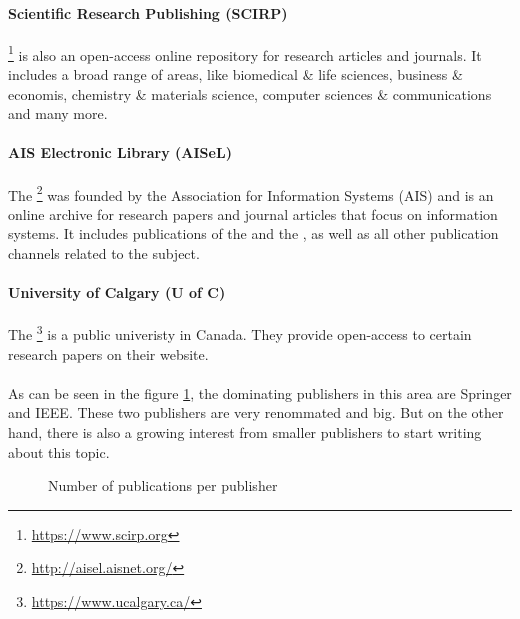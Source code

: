 \paragraph{Scientific Research Publishing (SCIRP)} \footnote{\url{https://www.scirp.org}} is also an open-access online repository for research articles and journals. It includes a broad range of areas, like biomedical \& life sciences, business \& economis, chemistry \& materials science, computer sciences \& communications and many more.
\paragraph{AIS Electronic Library (AISeL)} The \footnote{\url{http://aisel.aisnet.org/}} was founded by the Association for Information Systems (AIS) and is an online archive for research papers and journal articles that focus on information systems. It includes publications of the  and the , as well as all other publication channels related to the subject.
\paragraph{University of Calgary (U of C)} The \footnote{\url{https://www.ucalgary.ca/}} is a public univeristy in Canada. They provide open-access to certain research papers on their website.
\clearpage
\paragraph{} As can be seen in the figure \ref{fig:rq1_publishers}, the dominating publishers in this area are Springer and IEEE. These two publishers are very renommated and big. But on the other hand, there is also a growing interest from smaller publishers to start writing about this topic.
\begin{figure}[!ht]
	\centering
	\caption{Number of publications per publisher} 	
	\label{fig:rq1_publishers}
\end{figure}


\clearpage
